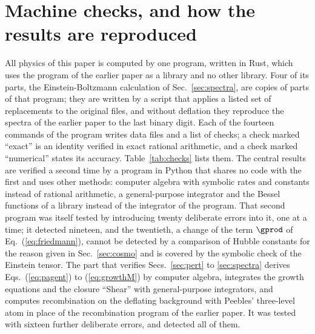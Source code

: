 \section{Machine checks, and how the results are reproduced}
\label{app:checks}

All physics of this paper is computed by one program, written in Rust, which uses the program of the
earlier paper as a library and no other library. Four of its parts, the Einstein-Boltzmann
calculation of Sec.~\ref{sec:spectra}, are copies of parts of that program; they are written by a
script that applies a listed set of replacements to the original files, and without deflation they
reproduce the spectra of the earlier paper to the last binary digit. Each of the fourteen commands
of the program writes data files and a list of checks; a check marked ``exact'' is an identity verified in exact rational arithmetic, and a
check marked ``numerical'' states its accuracy. Table~\ref{tab:checks} lists them. The central
results are verified a second time by a program in Python that shares no code with the first and
uses other methods: computer algebra with symbolic rates and constants instead of rational
arithmetic, a general-purpose integrator and the Bessel functions of a library instead of the
integrator of the program. That second program was itself tested by introducing twenty deliberate
errors into it, one at a time; it detected nineteen, and the twentieth, a change of the term
$\gprod$ of Eq.~(\ref{eq:friedmann}), cannot be detected by a comparison of Hubble constants for the
reason given in Sec.~\ref{sec:cosmo} and is covered by the symbolic check of the Einstein tensor.
The part that verifies Secs.~\ref{sec:pert} to \ref{sec:spectra} derives Eqs.~(\ref{eq:pagent}) to
(\ref{eq:growthM}) by computer algebra, integrates the growth equations and the closure ``Shear''
with general-purpose integrators, and computes recombination on the deflating background with
Peebles' three-level atom \cite{Peebles1968} in place of the recombination program of the earlier
paper. It was tested with sixteen further deliberate errors, and detected all of them.


